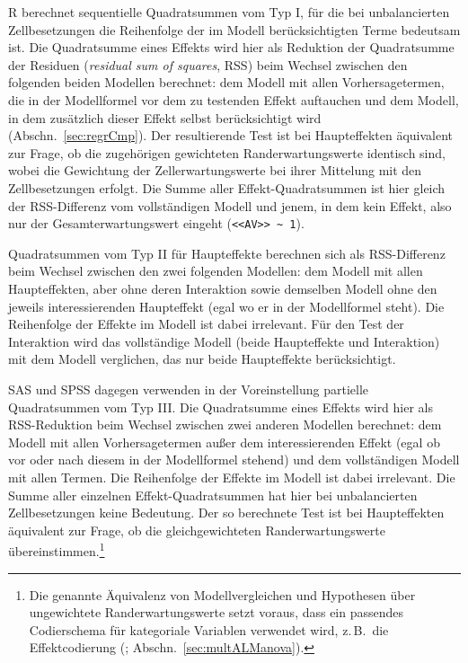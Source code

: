 R berechnet sequentielle Quadratsummen vom Typ I, für die bei unbalancierten Zellbesetzungen die Reihenfolge der im Modell berücksichtigten Terme bedeutsam ist. Die Quadratsumme eines Effekts wird hier als Reduktion der Quadratsumme der Residuen (\emph{residual sum of squares}, RSS) beim Wechsel zwischen den folgenden beiden Modellen berechnet: dem Modell mit allen Vorhersagetermen, die in der Modellformel vor dem zu testenden Effekt auftauchen und dem Modell, in dem zusätzlich dieser Effekt selbst berücksichtigt wird (Abschn.\ \ref{sec:regrCmp}). Der resultierende Test ist bei Haupteffekten äquivalent zur Frage, ob die zugehörigen gewichteten Randerwartungswerte identisch sind, wobei die Gewichtung der Zellerwartungswerte bei ihrer Mittelung mit den Zellbesetzungen erfolgt. Die Summe aller Effekt-Quadratsummen ist hier gleich der RSS-Differenz vom vollständigen Modell und jenem, in dem kein Effekt, also nur der Gesamterwartungswert eingeht (\lstinline!<<AV>> ~ 1!).

Quadratsummen vom Typ II für Haupteffekte berechnen sich als RSS-Differenz beim Wechsel zwischen den zwei folgenden Modellen: dem Modell mit allen Haupteffekten, aber ohne deren Interaktion sowie demselben Modell ohne den jeweils interessierenden Haupteffekt (egal wo er in der Modellformel steht). Die Reihenfolge der Effekte im Modell ist dabei irrelevant. Für den Test der Interaktion wird das vollständige Modell (beide Haupteffekte und Interaktion) mit dem Modell verglichen, das nur beide Haupteffekte berücksichtigt.

SAS und SPSS dagegen verwenden in der Voreinstellung partielle Quadratsummen vom Typ III\@. Die Quadratsumme eines Effekts wird hier als RSS-Reduktion beim Wechsel zwischen zwei anderen Modellen berechnet: dem Modell mit allen Vorhersagetermen außer dem interessierenden Effekt (egal ob vor oder nach diesem in der Modellformel stehend) und dem vollständigen Modell mit allen Termen. Die Reihenfolge der Effekte im Modell ist dabei irrelevant. Die Summe aller einzelnen Effekt-Quadratsummen hat hier bei unbalancierten Zellbesetzungen keine Bedeutung. Der so berechnete Test ist bei Haupteffekten äquivalent zur Frage, ob die gleichgewichteten Randerwartungswerte übereinstimmen.\footnote{\label{ftn:ssTypesCodes}Die genannte Äquivalenz von Modellvergleichen und Hypothesen über ungewichtete Randerwartungswerte setzt voraus, dass ein passendes Codierschema für kategoriale Variablen verwendet wird, z.\,B.\ die Effektcodierung (; Abschn.\ \ref{sec:multALManova}).}


